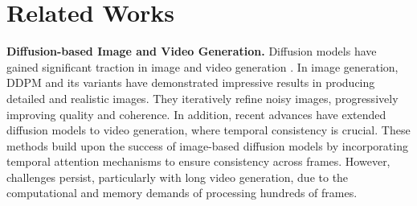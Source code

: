 \section{Related Works}
\textbf{Diffusion-based Image and Video Generation.} Diffusion models have gained significant traction in image and video generation \cite{nichol2021glide, rombach2022high, croitoru2023diffusion, guo2023zero, blattmann2023align, esser2024scaling, wang2024videocomposer, peng2024conditionvideo}. In image generation, DDPM \cite{ho2020denoising} and its variants \cite{song2020denoising, dhariwal2021diffusion, nichol2021improved, rombach2022high, croitoru2023diffusion, guo2023zero} have demonstrated impressive results in producing detailed and realistic images. They iteratively refine noisy images, progressively improving quality and coherence. In addition, recent advances \cite{ho2022imagen, ho2022video, wu2023tune, blattmann2023align, wang2024videocomposer} have extended diffusion models to video generation, where temporal consistency is crucial. These methods build upon the success of image-based diffusion models by incorporating temporal attention mechanisms to ensure consistency across frames. However, challenges persist, particularly with long video generation, due to the computational and memory demands of processing hundreds of frames.

